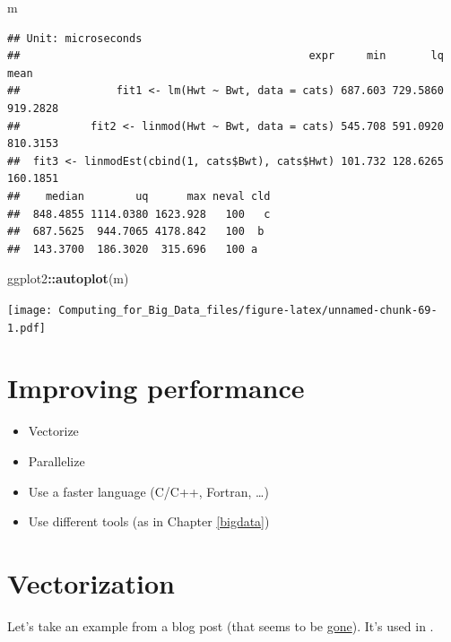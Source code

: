 \documentclass[]{book}
\newenvironment{Shaded}{\begin{snugshade}}{\end{snugshade}}
\newcommand{\KeywordTok}[1]{\textcolor[rgb]{0.13,0.29,0.53}{\textbf{#1}}}
\newcommand{\OperatorTok}[1]{\textcolor[rgb]{0.81,0.36,0.00}{\textbf{#1}}}
\newcommand{\NormalTok}[1]{#1}
\theoremstyle{definition}
\theoremstyle{definition}
\theoremstyle{definition}
\theoremstyle{remark}
\begin{document}
\begin{Shaded}
\begin{Highlighting}[]
\NormalTok{m}
\end{Highlighting}
\end{Shaded}

\begin{verbatim}
## Unit: microseconds
##                                             expr     min       lq     mean
##               fit1 <- lm(Hwt ~ Bwt, data = cats) 687.603 729.5860 919.2828
##           fit2 <- linmod(Hwt ~ Bwt, data = cats) 545.708 591.0920 810.3153
##  fit3 <- linmodEst(cbind(1, cats$Bwt), cats$Hwt) 101.732 128.6265 160.1851
##    median        uq      max neval cld
##  848.4855 1114.0380 1623.928   100   c
##  687.5625  944.7065 4178.842   100  b 
##  143.3700  186.3020  315.696   100 a
\end{verbatim}

\begin{Shaded}
\begin{Highlighting}[]
\NormalTok{ggplot2}\OperatorTok{::}\KeywordTok{autoplot}\NormalTok{(m)}
\end{Highlighting}
\end{Shaded}

\texttt{[image: Computing\_for\_Big\_Data\_files/figure-latex/unnamed-chunk-69-1.pdf]}

\section{Improving performance}\label{improving-performance}

\begin{itemize}
\item
  Vectorize
\item
  Parallelize
\item
  Use a faster language (C/C++, Fortran, \ldots{})
\item
  Use different tools (as in Chapter \ref{bigdata})
\end{itemize}

\section{Vectorization}\label{vectorization}

Let's take an example from a blog post (that seems to be
\href{http://www.babelgraph.org/wp/?p=358}{gone}). It's used in
\citet[Section
\href{http://adv-r.had.co.nz/Rcpp.html\#rcpp-case-studies}{Case
studies}]{Wickham2014}.
\end{document}

